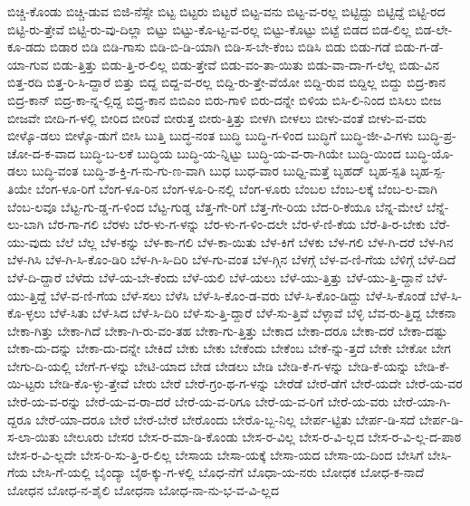 {ಬಿಚ್ಚಿ-ಕೊಂಡು
ಬಿಚ್ಚಿ-ಡುವ
ಬಿಜಿ-ನೆಸ್ಸೇ
ಬಿಟ್ಟ
ಬಿಟ್ಟರು
ಬಿಟ್ಟರೆ
ಬಿಟ್ಟ-ವನು
ಬಿಟ್ಟ-ವ-ರಲ್ಲ
ಬಿಟ್ಟಿದ್ದು
ಬಿಟ್ಟಿದ್ದೆ
ಬಿಟ್ಟಿ-ರದ
ಬಿಟ್ಟಿ-ರು-ತ್ತೇವೆ
ಬಿಟ್ಟಿ-ರು-ವು-ದಿಲ್ಲಾ
ಬಿಟ್ಟು
ಬಿಟ್ಟು-ಕೊ-ಟ್ಟ-ವ-ರಲ್ಲ
ಬಿಟ್ಟು-ಕೊಟ್ಟು
ಬಿಟ್ಟೆ
ಬಿಡದ
ಬಿಡ-ಲಿಲ್ಲ
ಬಿಡ-ಲೇ-ಕೂ-ಡದು
ಬಿಡಾರ
ಬಿಡಿ
ಬಿಡಿ-ಗಾಸು
ಬಿಡಿ-ಬಿ-ಡಿ-ಯಾಗಿ
ಬಿಡಿ-ಸ-ಬೇ-ಕೆಂಬ
ಬಿಡಿಸಿ
ಬಿಡು
ಬಿಡು-ಗಡೆ
ಬಿಡು-ಗ-ಡೆ-ಯಾ-ಗುವ
ಬಿಡು-ತ್ತಿತ್ತು
ಬಿಡು-ತ್ತಿ-ರ-ಲಿಲ್ಲ
ಬಿಡು-ತ್ತೇವೆ
ಬಿಡು-ವಂ-ತಾ-ಯಿತು
ಬಿಡು-ವಾ-ದಾ-ಗ-ಲೆಲ್ಲ
ಬಿಡು-ವಿನ
ಬಿತ್ತ-ರದಿ
ಬಿತ್ತ-ರಿ-ಸಿ-ದ್ದಾರೆ
ಬಿತ್ತು
ಬಿದ್ದ
ಬಿದ್ದ-ವ-ರಲ್ಲ
ಬಿದ್ದಿ-ರು-ತ್ತೇ-ವೆಯೋ
ಬಿದ್ದಿ-ರುವ
ಬಿದ್ದಿಲ್ಲ
ಬಿದ್ದು
ಬಿದ್ರ-ಕಾನ
ಬಿದ್ರ-ಕಾನ್
ಬಿದ್ರ-ಕಾ-ನ್ನ-ಲ್ಲಿದ್ದ
ಬಿದ್ರ್ರ-ಕಾನ
ಬಿಬಿಎಂ
ಬಿರು-ಗಾಳಿ
ಬಿರು-ದನ್ನೇ
ಬಿಳಿಯ
ಬಿಸಿ-ಲಿ-ನಿಂದ
ಬಿಸಿಲು
ಬೀಜ
ಬೀಜವೇ
ಬೀದಿ-ಗ-ಳಲ್ಲಿ
ಬೀರಿದ
ಬೀರಿವೆ
ಬೀರುತ್ತ
ಬೀರು-ತ್ತಿತ್ತು
ಬೀಳಗಿ
ಬೀಳಲು
ಬೀಳು-ವಂತೆ
ಬೀಳು-ವ-ವರು
ಬೀಳ್ಕೊ-ಡಲು
ಬೀಳ್ಕೊ-ಡುಗೆ
ಬೀಸಿ
ಬುತ್ತಿ
ಬುದ್ಧ-ನಂತ
ಬುದ್ಧಿ
ಬುದ್ಧಿ-ಗ-ಳಿಂದ
ಬುದ್ಧಿಗೆ
ಬುದ್ಧಿ-ಜೀ-ವಿ-ಗಳು
ಬುದ್ಧಿ-ಪ್ರ-ಚೋ-ದ-ಕ-ವಾದ
ಬುದ್ಧಿ-ಬ-ಲಕೆ
ಬುದ್ಧಿಯ
ಬುದ್ಧಿ-ಯ-ನ್ನಿಟ್ಟು
ಬುದ್ಧಿ-ಯ-ವ-ರಾ-ಗಿಯೇ
ಬುದ್ಧಿ-ಯಿಂದ
ಬುದ್ಧಿ-ಯೊ-ಡಲು
ಬುದ್ಧಿ-ವಂತ
ಬುದ್ಧಿ-ಶ-ಕ್ತಿ-ಗ-ನು-ಗು-ಣ-ವಾಗಿ
ಬುಧ
ಬುಧ-ವಾರ
ಬುಧ್ದಿ-ಮತ್ತೆ
ಬೃಹದ್
ಬೃಹ-ಸ್ಪತಿ
ಬೃಹ-ಸ್ಪ-ತಿಯೇ
ಬೆಂಗ-ಳೂ-ರಿಗೆ
ಬೆಂಗ-ಳೂ-ರಿನ
ಬೆಂಗ-ಳೂ-ರಿ-ನಲ್ಲಿ
ಬೆಂಗ-ಳೂರು
ಬೆಂಬಲ
ಬೆಂಬ-ಲಕ್ಕೆ
ಬೆಂಬ-ಲ-ವಾಗಿ
ಬೆಂಬ-ಲವೂ
ಬೆಟ್ಟ-ಗು-ಡ್ಡ-ಗ-ಳಿಂದ
ಬೆಟ್ಟ-ಗುಡ್ಡ
ಬೆತ್ತ-ಗೇ-ರಿಗೆ
ಬೆತ್ತ-ಗೇ-ರಿಯ
ಬೆದ-ರಿ-ಕೆಯೂ
ಬೆನ್ನ-ಮೇಲೆ
ಬೆನ್ನೆ-ಲು-ಬಾಗಿ
ಬೆರ-ಗಾ-ಗಲಿ
ಬೆರಳು
ಬೆರ-ಳು-ಗ-ಳನ್ನು
ಬೆರ-ಳು-ಗ-ಳಿಂ-ದಲೇ
ಬೆರ-ಳೆ-ಣಿ-ಕೆಯ
ಬೆರೆ-ತಿ-ರ-ಬೇಕು
ಬೆರೆ-ಯು-ವುದು
ಬೆಲೆ
ಬೆಲ್ಲ
ಬೆಳ-ಕನ್ನು
ಬೆಳ-ಕಾ-ಗಲಿ
ಬೆಳ-ಕಾ-ಯಿತು
ಬೆಳ-ಕಿಗೆ
ಬೆಳಕು
ಬೆಳ-ಗಲಿ
ಬೆಳ-ಗಿ-ದರೆ
ಬೆಳ-ಗಿನ
ಬೆಳ-ಗಿಸಿ
ಬೆಳ-ಗಿ-ಸಿ-ಕೊಂ-ಡಿರಿ
ಬೆಳ-ಗಿ-ಸಿ-ದಿರಿ
ಬೆಳ-ಗು-ವಂತ
ಬೆಳ-ಗ್ಗಿನ
ಬೆಳಗ್ಗೆ
ಬೆಳ-ವ-ಣಿ-ಗೆಯ
ಬೆಳಿಗ್ಗೆ
ಬೆಳೆ-ದಿದೆ
ಬೆಳೆ-ದಿ-ದ್ದಾರೆ
ಬೆಳೆದು
ಬೆಳೆ-ಯ-ಬೇ-ಕೆಂದು
ಬೆಳೆ-ಯಲಿ
ಬೆಳೆ-ಯಲು
ಬೆಳೆ-ಯು-ತ್ತಿತ್ತು
ಬೆಳೆ-ಯು-ತ್ತಿ-ದ್ದಾನೆ
ಬೆಳೆ-ಯು-ತ್ತಿದ್ದೆ
ಬೆಳೆ-ವ-ಣಿ-ಗೆಯ
ಬೆಳೆ-ಸಲು
ಬೆಳೆಸಿ
ಬೆಳೆ-ಸಿ-ಕೊಂ-ಡ-ವರು
ಬೆಳೆ-ಸಿ-ಕೊಂ-ಡಿದ್ದು
ಬೆಳೆ-ಸಿ-ಕೊಂಡೆ
ಬೆಳೆ-ಸಿ-ಕೊ-ಳ್ಳಲು
ಬೆಳೆ-ಸಿತು
ಬೆಳೆ-ಸಿದ
ಬೆಳೆ-ಸಿ-ದಿರಿ
ಬೆಳೆ-ಸು-ತ್ತಿ-ದ್ದಾರೆ
ಬೆಳೆ-ಸು-ತ್ತಿವೆ
ಬೆಳ್ಳಾವೆ
ಬೆಳ್ಳಿ
ಬೆವ-ರು-ತ್ತಿದ್ದ
ಬೇಕನಾ
ಬೇಕಾ-ಗಿತ್ತು
ಬೇಕಾ-ಗಿದೆ
ಬೇಕಾ-ಗಿ-ರು-ವಂ-ತಹ
ಬೇಕಾ-ಗು-ತ್ತಿತ್ತು
ಬೇಕಾದ
ಬೇಕಾ-ದರೂ
ಬೇಕಾ-ದರೆ
ಬೇಕಾ-ದಷ್ಟು
ಬೇಕಾ-ದು-ದನ್ನು
ಬೇಕಾ-ದು-ದನ್ನೇ
ಬೇಕಿದೆ
ಬೇಕು
ಬೇಕು
ಬೇಕೆಂದು
ಬೇಕೆಂಬ
ಬೇಕೆ-ನ್ನು-ತ್ತದೆ
ಬೇಕೇ
ಬೇಕೋ
ಬೇಗ
ಬೇಗು-ದಿ-ಯಲ್ಲಿ
ಬೇಗೆ-ಗ-ಳನ್ನು
ಬೇಟಿ-ಯಾದ
ಬೇಡ
ಬೇಡಲು
ಬೇಡಿ
ಬೇಡಿ-ಕೆ-ಗ-ಳನ್ನು
ಬೇಡಿ-ಕೆ-ಯನ್ನು
ಬೇಡಿ-ಕೆ-ಯಿ-ಟ್ಟರು
ಬೇಡಿ-ಕೊ-ಳ್ಳು-ತ್ತೇವೆ
ಬೇರು
ಬೇರೆ
ಬೇರೆ-ಗ್ರಂ-ಥ-ಗ-ಳನ್ನು
ಬೇರೆಡೆ
ಬೇರೆ-ಡೆಗೆ
ಬೇರೆ-ಯದೇ
ಬೇರೆ-ಯ-ವರ
ಬೇರೆ-ಯ-ವ-ರನ್ನು
ಬೇರೆ-ಯ-ವ-ರಾ-ದರೆ
ಬೇರೆ-ಯ-ವ-ರಿಗೂ
ಬೇರೆ-ಯ-ವ-ರಿಗೆ
ಬೇರೆ-ಯ-ವರು
ಬೇರೆ-ಯಾ-ಗಿ-ದ್ದರೂ
ಬೇರೆ-ಯಾ-ದರೂ
ಬೇರೆ
ಬೇರೆ-ಬೇರೆ
ಬೇರೊಂದು
ಬೇರೊ-ಬ್ಬ-ನಿಲ್ಲ
ಬೇರ್ಪ-ಟ್ಟಿತು
ಬೇರ್ಪ-ಡಿ-ಸದೆ
ಬೇರ್ಪ-ಡಿ-ಸ-ಲಾ-ಯಿತು
ಬೇಲೂರು
ಬೇಸರ
ಬೇಸ-ರ-ಮಾ-ಡಿ-ಕೊಂಡು
ಬೇಸ-ರ-ವಿಲ್ಲ
ಬೇಸ-ರ-ವಿ-ಲ್ಲದ
ಬೇಸ-ರ-ವಿ-ಲ್ಲ-ದ-ಪಾಠ
ಬೇಸ-ರ-ವಿ-ಲ್ಲದೇ
ಬೇಸ-ರಿ-ಸು-ತ್ತಿ-ರ-ಲಿಲ್ಲ
ಬೇಸಾಯ
ಬೇಸಾ-ಯಕ್ಕೆ
ಬೇಸಾ-ಯದ
ಬೇಸಾ-ಯ-ದಿಂದ
ಬೇಸಿಗೆ
ಬೇಸಿ-ಗೆಯ
ಬೇಸಿ-ಗೆ-ಯಲ್ಲಿ
ಬೈಂದ್ಯಾ
ಬೈಠ-ಕ್ಕು-ಗ-ಳಲ್ಲಿ
ಬೊಧ-ನೆಗೆ
ಬೊಧಾ-ಯ-ನರು
ಬೋಧಕ
ಬೋಧ-ಕ-ನಾದೆ
ಬೋಧನ
ಬೋಧ-ನ-ಶೈಲಿ
ಬೋಧನಾ
ಬೋಧ-ನಾ-ನು-ಭ-ವ-ವಿ-ಲ್ಲದ
}

